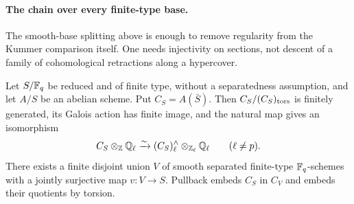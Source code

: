 \paragraph{The chain over every finite-type base.}
The smooth-base splitting above is enough to remove regularity from
the Kummer comparison itself.  One needs injectivity on sections,
not descent of a family of cohomological retractions along a
hypercover.

\begin{lemma}
\label{lem:B-sections-reduced}
Let \(S/\mathbb F_q\) be reduced and of finite type, without a
separatedness assumption, and let \(A/S\) be an abelian scheme.
Put \(C_S=A(\bar S)\).  Then \(C_S/(C_S)_{\rm tors}\)
is finitely generated, its Galois action has finite image, and
the natural map gives an isomorphism
\[
 C_S\otimes_{\mathbb Z}\mathbb Q_\ell
 \xrightarrow{\sim}
 (C_S)^{\wedge}_\ell\otimes_{\mathbb Z_\ell}\mathbb Q_\ell
 \qquad (\ell\ne p).
\]
There exists a finite disjoint union \(V\) of smooth separated
finite-type \(\mathbb F_q\)-schemes with a jointly surjective map
\(v:V\to S\).  Pullback embeds \(C_S\) in \(C_V\)
and embeds their quotients by torsion.
\end{lemma}
